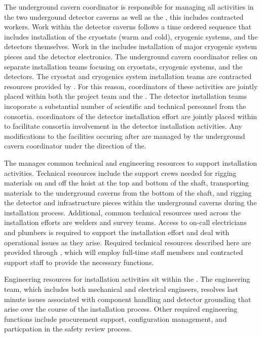 The underground cavern coordinator is responsible for managing all 
activities in the two undergound detector caverns as well as the
, this includes contracted workers.  Work within the
detector caverns follows a time ordered sequence that includes
installation of the cryostats (warm and cold), cryogenic systems, and
the detectors themselves.  Work in the  includes
installation of major cryogenic system pieces and the detector
 electronics.  The underground cavern coordinator relies on
separate installation teams focusing on cryostats, cryogenic systems,
and the detectors.  The cryostat and cryogenics system installation
teams are contracted resources provided by .  For this
reason, coordinators of these activities are jointly placed within 
both the  project team and the .  The detector
installation teams incoporate a substantial number of scientific and
technical personnel from the  consortia.   coordinators 
of the detector installation effort are jointly placed within 
  to facilitate consortia involvement in the 
detector installation activities.  Any modifications to the facilities 
occuring after  are managed by the underground cavern 
coordinator under the direction of the.

The  manages common technical and engineering resources to
support installation activities.  Technical resources include the
support crews needed for rigging materials on and off the hoist at the
top and bottom of the shaft, transporting materials to the underground
caverns from the bottom of the shaft, and rigging the detector and
infrastructure pieces within the underground caverns during the
installation process.  Additional, common technical resources used
across the installation efforts are welders and survey teams. Access
to on-call electricians and plumbers is required to support the
installation effort and deal with operational issues as they arise.
Required technical resources described here are provided through 
, which will employ full-time staff members and contracted
support staff to provide the necessary functions.

Engineering resources for installation activities sit within the .  
The engineering team, which includes both mechanical and electrical 
engineers, resolves last minute issues associated with component 
handling and detector grounding that arise over the course of the 
installation process.  Other required engineering functions include 
procurement support, configuration management, and particpation in 
the safety review process.

